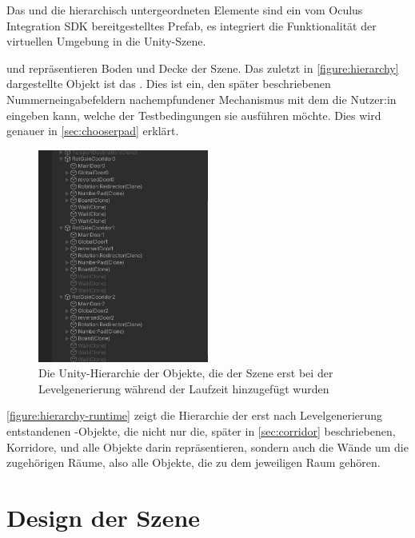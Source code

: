 Das  und die hierarchisch untergeordneten Elemente sind ein vom Oculus Integration SDK bereitgestelltes Prefab, es integriert die Funktionalität der virtuellen Umgebung in die Unity-Szene.

 und  repräsentieren Boden und Decke der Szene. Das zuletzt in \autoref{figure:hierarchy} dargestellte Objekt ist das . Dies ist ein, den später beschriebenen Nummerneingabefeldern nachempfundener Mechanismus mit dem die Nutzer:in eingeben kann, welche der Testbedingungen sie ausführen möchte. Dies wird genauer in \autoref{sec:chooserpad} erklärt.

\begin{figure}[!h]
    \centering
    \includegraphics[width=0.5\textwidth]{images/hierarchy_runtime.png}
    \caption{Die Unity-Hierarchie der Objekte, die der Szene erst bei der Levelgenerierung während der Laufzeit hinzugefügt wurden}\label{figure:hierarchy-runtime}
\end{figure}
\autoref{figure:hierarchy-runtime} zeigt die Hierarchie der erst nach Levelgenerierung entstandenen -Objekte, die nicht nur die, später in \autoref{sec:corridor} beschriebenen, Korridore, und alle Objekte darin repräsentieren, sondern auch die Wände um die zugehörigen Räume, also alle Objekte, die zu dem jeweiligen Raum gehören.

\section{Design der Szene} \label{sec:scene-design}

